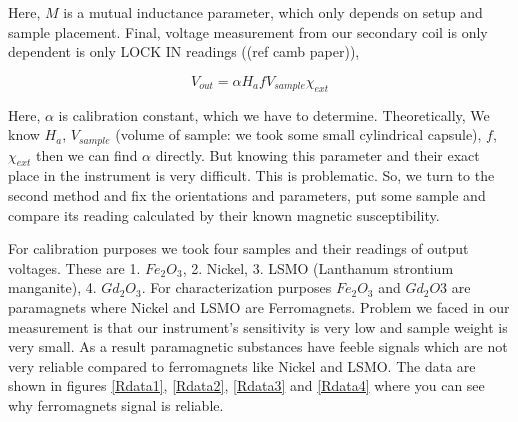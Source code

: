Here, $M$ is a mutual inductance parameter, which only depends on setup and sample placement. Final, voltage measurement from our secondary coil is only dependent is only LOCK IN readings ((ref camb paper)),

\begin{equation*}
V_{out} = \alpha H_a f V_{sample} \chi_{ext}
\end{equation*}

Here, $\alpha$ is calibration constant, which we have to determine. Theoretically, We know $H_a$, $V_{sample}$ (volume of sample: we took some small cylindrical capsule), $f$, $\chi_{ext}$ then we can find $\alpha$ directly. But knowing this parameter and their exact place in the instrument is very difficult. This is problematic. So, we turn to the second method and fix the orientations and parameters, put some sample and compare its reading calculated by their known magnetic susceptibility. 

For calibration purposes we took four samples and their readings of output voltages. These are 1. $Fe_2O_3$, 2. Nickel, 3. LSMO (Lanthanum strontium manganite), 4. $Gd_2O_3$. For characterization purposes $Fe_2O_3$ and $Gd_2O3$ are paramagnets where Nickel and LSMO are Ferromagnets. Problem we faced in our measurement is that our instrument’s sensitivity is very low and sample weight is very small. As a result paramagnetic substances have feeble signals which are not very reliable compared to ferromagnets like Nickel and LSMO. The data are shown in figures \ref{Rdata1}, \ref{Rdata2}, \ref{Rdata3} and \ref{Rdata4} where you can see why ferromagnets signal is reliable.


